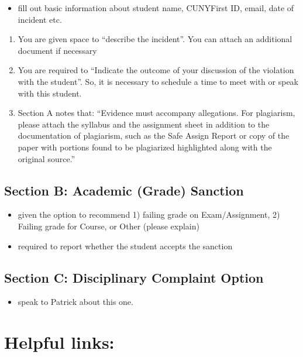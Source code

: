\documentclass[]{book}
\providecommand{\tightlist}{%
  \setlength{\itemsep}{0pt}\setlength{\parskip}{0pt}}
\theoremstyle{definition}
\theoremstyle{definition}
\theoremstyle{definition}
\theoremstyle{remark}
\begin{document}
\begin{itemize}
\tightlist
\item
  fill out basic information about student name, CUNYFirst ID, email,
  date of incident etc.
\end{itemize}

\begin{enumerate}
\def\labelenumi{\alph{enumi}.}
\tightlist
\item
  You are given space to ``describe the incident''. You can attach an
  additional document if necessary
\item
  You are required to ``Indicate the outcome of your discussion of the
  violation with the student''. So, it is necessary to schedule a time
  to meet with or speak with this student.
\item
  Section A notes that: ``Evidence must accompany allegations. For
  plagiarism, please attach the syllabus and the assignment sheet in
  addition to the documentation of plagiarism, such as the Safe Assign
  Report or copy of the paper with portions found to be plagiarized
  highlighted along with the original source.''
\end{enumerate}

\subsection{Section B: Academic (Grade)
Sanction}\label{section-b-academic-grade-sanction}

\begin{itemize}
\tightlist
\item
  given the option to recommend 1) failing grade on Exam/Assignment, 2)
  Failing grade for Course, or Other (please explain)
\item
  required to report whether the student accepts the sanction
\end{itemize}

\subsection{Section C: Disciplinary Complaint
Option}\label{section-c-disciplinary-complaint-option}

\begin{itemize}
\tightlist
\item
  speak to Patrick about this one.
\end{itemize}

\section{Helpful links:}\label{helpful-links}
\end{document}
